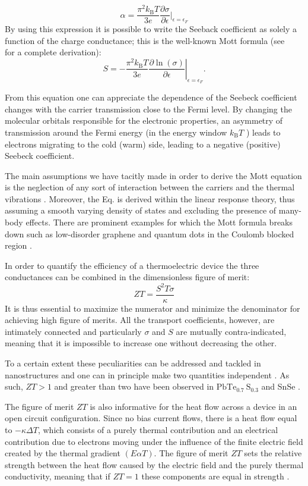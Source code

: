 $$
    \alpha=\frac{\pi^2 k_\mathrm{B}T}{3e}\frac{\partial\sigma}{\partial\epsilon}|_{\epsilon=\epsilon_{F}}
$$
By using this expression it is possible to write the Seeback coefficient as solely a function of the charge conductance; this is the well-known Mott formula (see ~\cite{behnia2015fundamentals} for a complete derivation):
$$
    S=-\left.\frac{\pi^{2}k_\mathrm{B} T}{3e}\frac{\partial \ln (\sigma)}{\partial \epsilon}\right|_{\epsilon=\epsilon_{F}} .
$$

From this equation one can appreciate the dependence of the Seebeck coefficient changes with the carrier transmission close to the Fermi level. By changing the molecular orbitals responsible for the electronic properties, an asymmetry of transmission around the Fermi energy (in the energy window $k_{\mathrm{B}} T$ ) leads to electrons migrating to the cold (warm) side, leading to a negative (positive) Seebeck coefficient.

The main assumptions we have tacitly made in order to derive the Mott equation is the neglection of any sort of interaction between the carriers and the thermal vibrations \cite{dubi2011colloquium}. Moreover, the Eq. is derived within the linear response theory, thus assuming a smooth varying density of states and excluding the presence of many-body effects. There are prominent examples for which the Mott formula breaks down such as low-disorder graphene \cite{ghahari2016enhanced} and quantum dots in the Coulomb blocked region \cite{beenakker1992theory}.

In order to quantify the efficiency of a thermoelectric device the three conductances can be combined in the dimensionless figure of merit:
$$
    Z T=\frac{S^{2} T \sigma}{\kappa}
$$
It is thus essential to maximize the numerator and minimize the denominator for achieving high figure of merits. All the transport coefficients, however, are intimately connected and particularly $\sigma$ and $S$ are mutually contra-indicated, meaning that it is impossible to increase one without decreasing the other.

To a certain extent these peculiarities can be addressed and tackled in nanostructures and one can in principle make two quantities independent \cite{venkatasubramanian2001thin}. As such, $ZT>1$ \cite{fu2015realizing} and greater than two have been observed in $\mathrm{PbTe}_{0.7} \mathrm{~S}_{0.3}$ and SnSe \cite{wu2014broad}.

The figure of merit $ZT$ is also informative for the heat flow across a device in an open circuit configuration. Since no bias current flows, there is a heat flow equal to $-\kappa \Delta T$, which consists of a purely thermal contribution and an electrical contribution due to electrons moving under the influence of the finite electric field created by the thermal gradient $(E \alpha T)$. The figure of merit $Z T$ sets the relative strength between the heat flow caused by the electric field and the purely thermal conductivity, meaning that if $Z T=1$ these components are equal in strength \cite{behnia2015fundamentals}.

